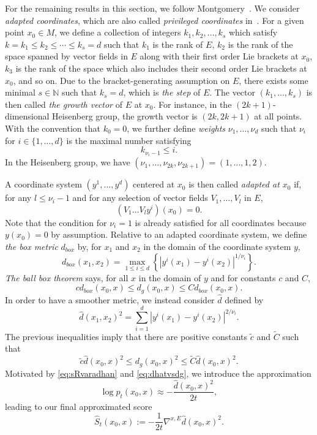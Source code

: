 \documentclass[10pt]{amsart}
\theoremstyle{remark}
\newcommand{\N}{\mathbb{N}}
\numberwithin{equation}{section}
\begin{document}
For the remaining results in this section, we follow Montgomery~\cite[Chapter~2.4]{montgomery2002tour}. We consider \emph{adapted coordinates}, which are also called \emph{privileged coordinates} in~\cite{bellaiche1996tangent}. For a given point $x_0 \in M$, we define a collection of integers $k_1,k_2,\dots,k_s$ which satisfy $k= k_1 \leq  k_2 \leq \cdots \leq k_s=d$ such that $k_1$ is the rank of $E$, $k_2$ is the rank of the space spanned by vector fields in $E$ along with their first order Lie brackets at $x_0$, $k_3$ is the rank of the space which also includes their second order Lie brackets at $x_0$, and so on. Due to the bracket-generating assumption on $E$, there exists some minimal $s\in\N$ such that $k_s=d$, which is \emph{the step} of $E$. The vector $(k_1, \dots, k_s)$ is then called \emph{the growth vector} of $E$ at $x_0$.
For instance, in the $(2k+1)$-dimensional Heisenberg group, the growth vector is $(2k,2k+1)$ at all points. With the convention that $k_0=0$, we further define \emph{weights} $\nu_1, \dots, \nu_d$ such that $\nu_i$ for $i\in\{1,\dots, d\}$ is the maximal number satisfying
$$k_{\nu_i-1} \leq i.$$
In the Heisenberg group, we have $(\nu_1,\dots,\nu_{2k},\nu_{2k+1}) =(1,\dots, 1,2)$.

A coordinate system $(y^1,\dots,y^d)$ centered at $x_0$ is then called \emph{adapted at $x_0$} if, for any $l \leq \nu_i-1$ and for any selection of vector fields $V_1,\dots, V_l$ in $E$,
$$\left(V_1\dots V_l y^i\right)(x_0) = 0.$$
Note that the condition for $\nu_i =1$ is already satisfied for all coordinates because $y(x_0) = 0$ by assumption. Relative to an adapted coordinate system, we define \emph{the box metric} $d_{box}$ by, for $x_1$ and $x_2$ in the domain of the coordinate system $y$,
$$d_{box}(x_1, x_2) =\max_{1\leq i \leq d} \left\{ |y^i(x_1) - y^i(x_2)|^{1/\nu_i}\right\}.$$
\emph{The ball box theorem} says, for all $x$ in the domain of $y$ and for constants $c$ and $C$,
$$c d_{box}(x_0,x) \leq d_g(x_0,x) \leq C d_{box}(x_0,x).$$
In order to have a smoother metric, we instead consider $\hat d$ defined by
$$\hat d(x_1,x_2)^2 = \sum_{i=1}^d |y^i(x_1) - y^i(x_2)|^{2/\nu_i}.$$
The previous inequalities imply that there are positive constants $\tilde c$ and $\tilde C$ such that
\begin{equation}\label{eq:dhatvsdg}
    \tilde c \hat d(x_0,x)^2 \leq d_g(x_0,x)^2 \leq \tilde C \hat d(x_0,x)^2.
\end{equation}
Motivated by \eqref{eq:sRvaradhan} and \eqref{eq:dhatvsdg}, we introduce the approximation
$$\log p_t(x_0,x) \approx  -\frac{\hat d(x_0,x)^2}{2t},$$
leading to our final approximated score
$$\hat S_t(x_0,x) := -\frac{1}{2t}\nabla^{x,E} \hat d(x_0,x)^2.$$
\end{document}
